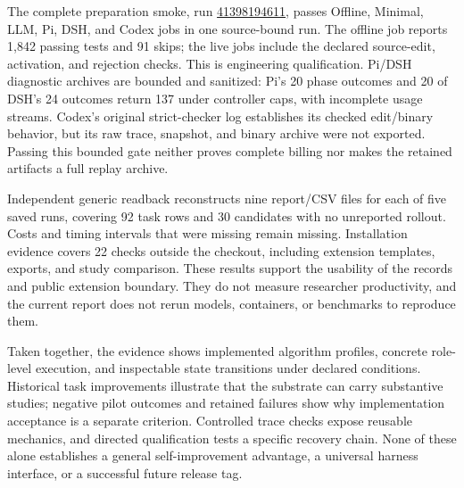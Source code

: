 The complete preparation smoke, run \href{https://github.com/proteus-evolve/Proteus/actions/runs/41398194611}{41398194611}, passes Offline, Minimal, LLM, Pi, DSH, and Codex jobs in one source-bound run. The offline job reports 1,842 passing tests and 91 skips; the live jobs include the declared source-edit, activation, and rejection checks. This is engineering qualification. Pi/DSH diagnostic archives are bounded and sanitized: Pi's 20 phase outcomes and 20 of DSH's 24 outcomes return 137 under controller caps, with incomplete usage streams. Codex's original strict-checker log establishes its checked edit/binary behavior, but its raw trace, snapshot, and binary archive were not exported. Passing this bounded gate neither proves complete billing nor makes the retained artifacts a full replay archive.

Independent generic readback reconstructs nine report/CSV files for each of five saved runs, covering 92 task rows and 30 candidates with no unreported rollout. Costs and timing intervals that were missing remain missing. Installation evidence covers 22 checks outside the checkout, including extension templates, exports, and study comparison. These results support the usability of the records and public extension boundary. They do not measure researcher productivity, and the current report does not rerun models, containers, or benchmarks to reproduce them.

Taken together, the evidence shows implemented algorithm profiles, concrete role-level execution, and inspectable state transitions under declared conditions. Historical task improvements illustrate that the substrate can carry substantive studies; negative pilot outcomes and retained failures show why implementation acceptance is a separate criterion. Controlled trace checks expose reusable mechanics, and directed qualification tests a specific recovery chain. None of these alone establishes a general self-improvement advantage, a universal harness interface, or a successful future release tag.
